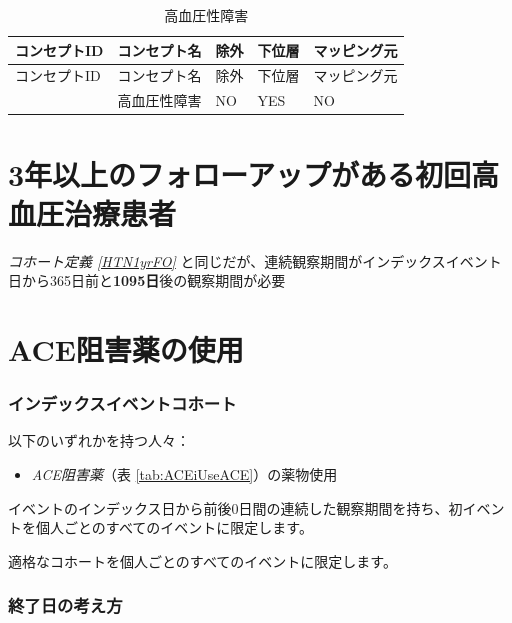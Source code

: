 \documentclass[
  11pt]{book}
\providecommand{\tightlist}{%
  \setlength{\itemsep}{0pt}\setlength{\parskip}{0pt}}
\theoremstyle{definition}
\theoremstyle{definition}
\theoremstyle{definition}
\theoremstyle{definition}
\theoremstyle{remark}
\begin{document}
\begin{longtable}[]{@{}lllll@{}}
\caption{\label{tab:HTN1yrFOHypertensiveDisorder} 高血圧性障害}\tabularnewline
\toprule\noalign{}
コンセプトID & コンセプト名 & 除外 & 下位層 & マッピング元 \\
\midrule\noalign{}
\endfirsthead
\toprule\noalign{}
コンセプトID & コンセプト名 & 除外 & 下位層 & マッピング元 \\
\midrule\noalign{}
\endhead
\bottomrule\noalign{}
\endlastfoot
316866 & 高血圧性障害 & NO & YES & NO \\
\end{longtable}

\section{3年以上のフォローアップがある初回高血圧治療患者}\label{HTN3yrFO}

\emph{コホート定義 \ref{HTN1yrFO}} と同じだが、連続観察期間がインデックスイベント日から365日前と\textbf{1095日}後の観察期間が必要

\section{ACE阻害薬の使用}\label{ACEiUse}

\subsubsection*{インデックスイベントコホート}\label{ux30a4ux30f3ux30c7ux30c3ux30afux30b9ux30a4ux30d9ux30f3ux30c8ux30b3ux30dbux30fcux30c8-3}

以下のいずれかを持つ人々：

\begin{itemize}
\tightlist
\item
  \emph{ACE阻害薬}（表 \ref{tab:ACEiUseACE}）の薬物使用
\end{itemize}

イベントのインデックス日から前後0日間の連続した観察期間を持ち、初イベントを個人ごとのすべてのイベントに限定します。

適格なコホートを個人ごとのすべてのイベントに限定します。

\subsubsection*{終了日の考え方}\label{ux7d42ux4e86ux65e5ux306eux8003ux3048ux65b9-4}
\end{document}

